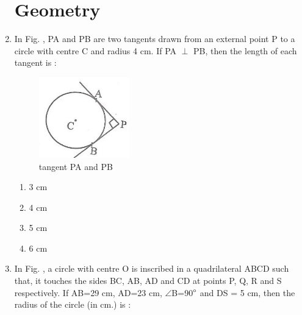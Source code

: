 \documentclass[10pt,-letter paper]{article}
\begin{document}
\begin{enumerate}
 \section{Geometry}
\item In Fig. , PA and PB are two tangents drawn from an external point P to a
circle with centre C and radius 4 cm. If PA $\perp$ PB, then the length of each
tangent is :
\begin{figure}[H]
			\centering
			\includegraphics[width=\columnwidth]{1.png}
\caption{tangent PA and PB}
    \label{fig:fig1}
		\end{figure}
 \begin{enumerate}
    \item 3 cm\\
    \item 4 cm\\
    \item 5 cm\\
    \item 6 cm
 \end{enumerate}
\item In Fig. , a circle with centre O is inscribed in a quadrilateral ABCD such
that, it touches the sides BC, AB, AD and CD at points P, Q, R and S respectively. If AB=29 cm, AD=23 cm, $\angle$B=90$\degree$ and DS = 5 cm, then the radius of the circle (in cm.) is : \\
		\begin{figure}

\end{figure}
\end{enumerate}
\end{document}
